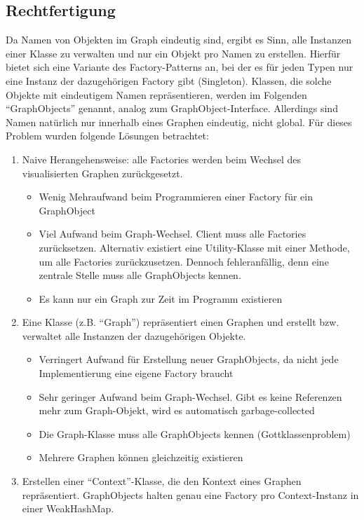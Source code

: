\documentclass[accentcolor=tud0b,12pt,paper=a4]{tudreport}
\begin{document}
		\subsection{Rechtfertigung}
			Da Namen von Objekten im Graph eindeutig sind, ergibt es Sinn, alle Instanzen einer Klasse zu verwalten und nur ein Objekt pro Namen zu erstellen. Hierfür bietet sich eine Variante des Factory-Patterns an, bei der es für jeden Typen nur eine Instanz der dazugehörigen Factory gibt (Singleton).
			Klassen, die solche Objekte mit eindeutigem Namen repräsentieren, werden im Folgenden "`GraphObjects"' genannt, analog zum GraphObject-Interface.
			Allerdings sind Namen natürlich nur innerhalb eines Graphen eindeutig, nicht global. Für dieses Problem wurden folgende Lösungen betrachtet:
			\begin{enumerate}
				\item Naive Herangehensweise: alle Factories werden beim Wechsel des visualisierten Graphen zurückgesetzt.
				\begin{itemize}
					\item Wenig Mehraufwand beim Programmieren einer Factory für ein GraphObject
					\item Viel Aufwand beim Graph-Wechsel. Client muss alle Factories zurücksetzen. Alternativ existiert eine Utility-Klasse mit einer Methode, um alle Factories zurückzusetzen. Dennoch fehleranfällig, denn eine zentrale Stelle muss alle GraphObjects kennen.
					\item Es kann nur ein Graph zur Zeit im Programm existieren
				\end{itemize}
				\item Eine Klasse (z.B. "`Graph"') repräsentiert einen Graphen und erstellt bzw. verwaltet alle Instanzen der dazugehörigen Objekte.
				\begin{itemize}
					\item Verringert Aufwand für Erstellung neuer GraphObjects, da nicht jede Implementierung eine eigene Factory braucht
					\item Sehr geringer Aufwand beim Graph-Wechsel. Gibt es keine Referenzen mehr zum Graph-Objekt, wird es automatisch garbage-collected
					\item Die Graph-Klasse muss alle GraphObjects kennen (Gottklassenproblem) 
					\item Mehrere Graphen können gleichzeitig existieren
				\end{itemize}
				\item Erstellen einer "`Context"'-Klasse, die den Kontext eines Graphen repräsentiert. GraphObjects halten genau eine Factory pro Context-Instanz in einer WeakHashMap.

\end{enumerate}
\end{document}
